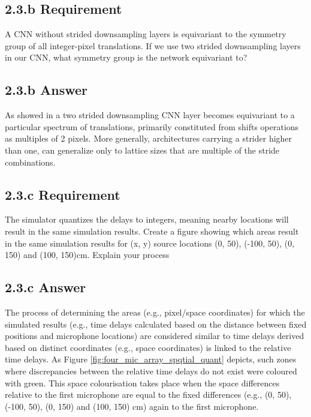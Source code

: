 \documentclass{vgtc}                          %
\begin{document}
\subsection{2.3.b Requirement}
A CNN without strided downsampling layers is equivariant to the symmetry group of
all integer-pixel translations. If we use two strided downsampling layers in our CNN,
what symmetry group is the network equivariant to? 
\subsection{2.3.b Answer}
As showed in \cite{PhysRevD.104.074504} \cite{cohen2016group} a two strided downsampling CNN layer becomes equivariant to a particular spectrum of translations, primarily constituted from shifts operations as multiples of 2 pixels. More generally, architectures carrying a strider higher than one, can generalize only to lattice sizes that are multiple of the stride combinations. 

\subsection{2.3.c Requirement}
The simulator quantizes the delays to integers, meaning nearby locations will result
in the same simulation results. Create a figure showing which areas result in the
same simulation results for (x, y) source locations (0, 50), (-100, 50), (0, 150) and
(100, 150)cm. Explain your process
\subsection{2.3.c Answer}
The process of determining the areas (e.g., pixel/space coordinates) for which the simulated results (e.g., time delays calculated based on the distance between fixed positions and microphone locations) are considered similar to time delays derived based on distinct coordinates (e.g., space coordinates) is linked to the relative time delays. As Figure \ref{fig:four_mic_array_spqtial_quant} depicts, such zones where discrepancies between the relative time delays do not exist were coloured with green. This space colourisation takes place when the space differences relative to the first microphone are equal to the fixed differences (e.g., (0, 50), (-100, 50), (0, 150) and (100, 150) cm) again to the first microphone. 
\end{document}
